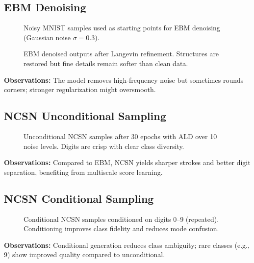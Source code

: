 \documentclass[a4paper,12pt]{article}
\begin{document}
\subsection{EBM Denoising}
\begin{figure}[H]
    \centering
    \caption{Noisy MNIST samples used as starting points for EBM denoising (Gaussian noise $\sigma=0.3$).}
    \label{fig:ebm_noisy}
\end{figure}
\begin{figure}[H]
    \centering
    \caption{EBM denoised outputs after Langevin refinement. Structures are restored but fine details remain softer than clean data.}
    \label{fig:ebm_denoised}
\end{figure}
\textbf{Observations:} The model removes high-frequency noise but sometimes rounds corners; stronger regularization might oversmooth.

\subsection{NCSN Unconditional Sampling}
\begin{figure}[H]
    \centering
    \caption{Unconditional NCSN samples after 30 epochs with ALD over 10 noise levels. Digits are crisp with clear class diversity.}
    \label{fig:ncsn_samples}
    \end{figure}
\textbf{Observations:} Compared to EBM, NCSN yields sharper strokes and better digit separation, benefiting from multiscale score learning.

\subsection{NCSN Conditional Sampling}
\begin{figure}[H]
    \centering
    \caption{Conditional NCSN samples conditioned on digits 0--9 (repeated). Conditioning improves class fidelity and reduces mode confusion.}
    \label{fig:ncsn_cond}
\end{figure}
\textbf{Observations:} Conditional generation reduces class ambiguity; rare classes (e.g., 9) show improved quality compared to unconditional.
\end{document}
